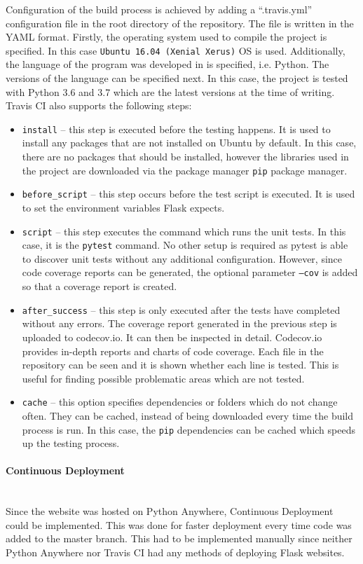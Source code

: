 \documentclass[12pt,a4paper]{article}
\newcommand{\myparagraph}[1]{\paragraph{#1}\mbox{}\\}
\begin{document}
Configuration of the build process is achieved by adding a “.travis.yml” configuration file in the root directory of the repository. The file is written in the YAML format. Firstly, the operating system used to compile the project is specified. In this case \texttt{Ubuntu 16.04 (Xenial Xerus)} OS is used. Additionally, the language of the program was developed in is specified, i.e. Python. The versions of the language can be specified next. In this case, the project is tested with Python 3.6 and 3.7 which are the latest versions at the time of writing. Travis CI also supports the following steps:
\begin{itemize}
	\item \texttt{install} – this step is executed before the testing happens. It is used to install any packages that are not installed on Ubuntu by default. In this case, there are no packages that should be installed, however the libraries used in the project are downloaded via the package manager \texttt{pip} package manager.
	\item \texttt{before\_script} – this step occurs before the test script is executed. It is used to set the environment variables Flask expects. 
	\item \texttt{script} – this step executes the command which runs the unit tests. In this case, it is the \texttt{pytest} command. No other setup is required as pytest is able to discover unit tests without any additional configuration. However, since code coverage reports can be generated, the optional parameter \texttt{--cov} is added so that a coverage report is created.
	\item \texttt{after\_success} – this step is only executed after the tests have completed without any errors. The coverage report generated in the previous step is uploaded to codecov.io. It can then be inspected in detail. Codecov.io provides in-depth reports and charts of code coverage. Each file in the repository can be seen and it is shown whether each line is tested. This is useful for finding possible problematic areas which are not tested. 
	\item \texttt{cache} – this option specifies dependencies or folders which do not change often. They can be cached, instead of being downloaded every time the build process is run. In this case, the \texttt{pip} dependencies can be cached which speeds up the testing process.
\end{itemize}

\myparagraph{Continuous Deployment}
Since the website was hosted on Python Anywhere, Continuous Deployment could be implemented. This was done for faster deployment every time code was added to the master branch. This had to be implemented manually since neither Python Anywhere nor Travis CI had any methods of deploying Flask websites. 
\end{document}
